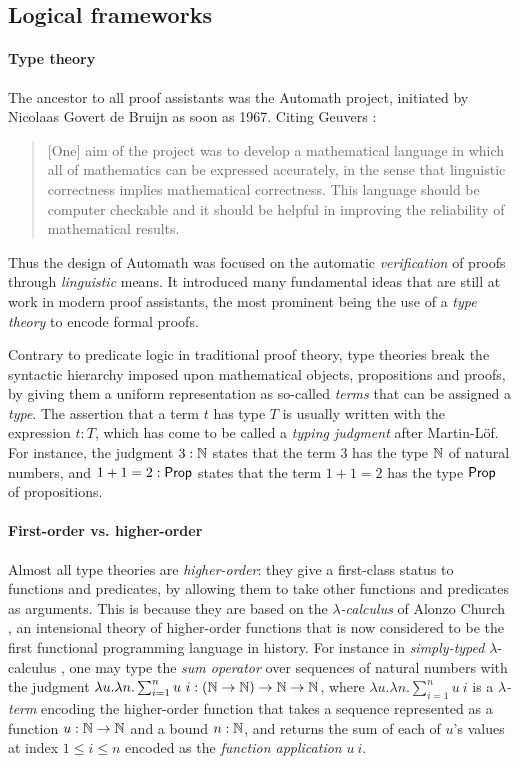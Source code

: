 \subsection{Logical frameworks}

\paragraph{Type theory}

The ancestor to all proof assistants was the Automath project, initiated by
Nicolaas Govert de Bruijn as soon as 1967. Citing Geuvers
:
\begin{quote}
[One] aim of the project was to develop a mathematical language in which all of
mathematics can be expressed accurately, in the sense that linguistic
correctness implies mathematical correctness. This language should be computer
checkable and it should be helpful in improving the reliability of mathematical
results.
\end{quote}
Thus the design of Automath was focused on the automatic \emph{verification} of
proofs through \emph{linguistic} means. It introduced many fundamental ideas
that are still at work in modern proof assistants, the most prominent being the
use of a \emph{type theory} to encode formal proofs.

Contrary to predicate logic in traditional proof theory, type theories break the
syntactic hierarchy imposed upon mathematical objects, propositions and proofs,
by giving them a uniform representation as so-called \emph{terms} that can be
assigned a \emph{type}. The assertion that a term $t$ has type $T$ is usually
written with the expression $t : T$, which has come to be called a \emph{typing
judgment} after Martin-Löf. For instance, the judgment $3 : \mathbb{N}$ states that
the term $3$ has the type $\mathbb{N}$ of natural numbers, and $1 + 1 = 2 : \mathsf{Prop}$
states that the term $1 + 1 = 2$ has the type $\mathsf{Prop}$ of propositions.

\paragraph{First-order vs. higher-order}

Almost all type theories are \emph{higher-order}: they give a first-class status
to functions and predicates, by allowing them to take other functions and
predicates as arguments. This is because they are based on the
\emph{$\lambda$-calculus} of Alonzo Church
, an intensional theory of
higher-order functions that is now considered to be the first functional
programming language in history. For instance in \emph{simply-typed}
$\lambda$-calculus , one may type
the \emph{sum operator} over sequences of natural numbers with the judgment
$\lambda u. \lambda n. \sum_{i = 1}^{n}{u~i} : (\mathbb{N} \to \mathbb{N}) \to \mathbb{N} \to
\mathbb{N}$, where $\lambda u. \lambda n. \sum_{i = 1}^{n}{u~i}$ is a
\emph{$\lambda$-term} encoding the higher-order function that takes a sequence
represented as a function $u : \mathbb{N} \to \mathbb{N}$ and a bound $n : \mathbb{N}$, and
returns the sum of each of $u$'s values at index $1 \leq i \leq n$ encoded as
the \emph{function application} $u~i$.

